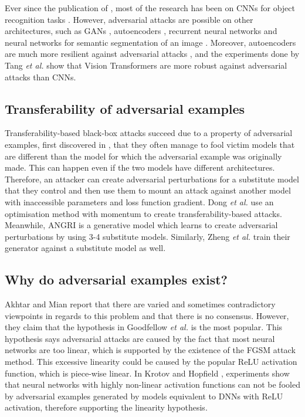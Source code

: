 Ever since the publication of \cite{szegedy2014intriguing}, most of the research has been on CNNs for object recognition tasks \cite{akhtar}. However, adversarial attacks are possible on other architectures, such as GANs \cite{kos_attacks_on_gans}, autoencoders \cite{tabacof_attacks_autoencoders}, recurrent neural networks \cite{papernot_attacks_rnns} and neural networks for semantic segmentation of an image \cite{Metzen_2017_ICCV}. Moreover, autoencoders are much more resilient against adversarial attacks \cite{tabacof_attacks_autoencoders}, and the experiments done by Tang \textit{et al.} \cite{robustart} show that Vision Transformers are more robust against adversarial attacks than CNNs.

\subsection{Transferability of adversarial examples}

Transferability-based black-box attacks succeed due to a property of adversarial examples, first discovered in \cite{szegedy2014intriguing}, that they often manage to fool victim models that are different than the model for which the adversarial example was originally made. This can happen even if the two models have different architectures. Therefore, an attacker can create adversarial perturbations for a substitute model that they control and then use them to mount an attack against another model with inaccessible parameters and loss function gradient. Dong \textit{et al.} \cite{mim} use an optimisation method with momentum to create transferability-based attacks. Meanwhile, ANGRI \cite{upset_angri} is a generative model which learns to create adversarial perturbations by using 3-4 substitute models. Similarly, Zheng \textit{et al.} \cite{zheng_black_box_GAN} train their generator against a substitute model as well.

\subsection{Why do adversarial examples exist?}

Akhtar and Mian \cite{akhtar} report that there are varied and sometimes contradictory viewpoints in regards to this problem and that there is no consensus. However, they claim that the hypothesis in Goodfellow \textit{et al.} \cite{fgsm} is the most popular. This hypothesis says adversarial attacks are caused by the fact that most neural networks are too linear, which is supported by the existence of the FGSM \cite{fgsm} attack method. This excessive linearity could be caused by the popular ReLU activation function, which is piece-wise linear. In Krotov and Hopfield \cite{krotov2018dam}, experiments show that neural networks with highly non-linear activation functions can not be fooled by adversarial examples generated by models equivalent to DNNs with ReLU activation, therefore supporting the linearity hypothesis. 


